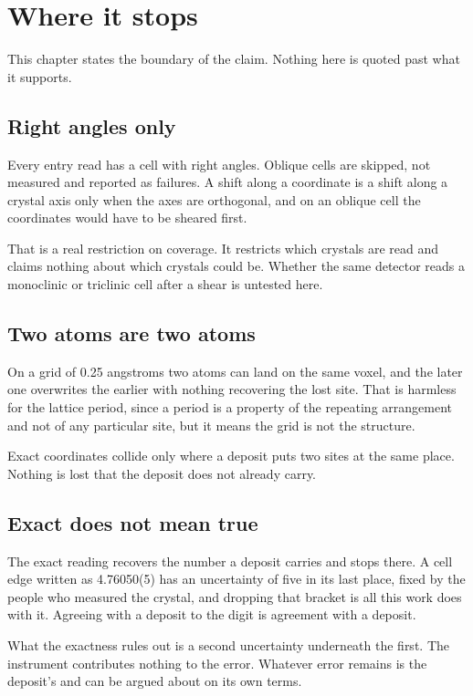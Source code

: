 \chapter{Where it stops}

This chapter states the boundary of the claim. Nothing here is quoted past what it supports.

\section{Right angles only}

Every entry read has a cell with right angles. Oblique cells are skipped, not measured and reported as failures. A shift along a coordinate is a shift along a crystal axis only when the axes are orthogonal, and on an oblique cell the coordinates would have to be sheared first.

That is a real restriction on coverage. It restricts which crystals are read and claims nothing about which crystals could be. Whether the same detector reads a monoclinic or triclinic cell after a shear is untested here.

\section{Two atoms are two atoms}

On a grid of 0.25 angstroms two atoms can land on the same voxel, and the later one overwrites the earlier with nothing recovering the lost site. That is harmless for the lattice period, since a period is a property of the repeating arrangement and not of any particular site, but it means the grid is not the structure.

Exact coordinates collide only where a deposit puts two sites at the same place. Nothing is lost that the deposit does not already carry.

\section{Exact does not mean true}

The exact reading recovers the number a deposit carries and stops there. A cell edge written as 4.76050(5) has an uncertainty of five in its last place, fixed by the people who measured the crystal, and dropping that bracket is all this work does with it. Agreeing with a deposit to the digit is agreement with a deposit.

What the exactness rules out is a second uncertainty underneath the first. The instrument contributes nothing to the error. Whatever error remains is the deposit's and can be argued about on its own terms.

